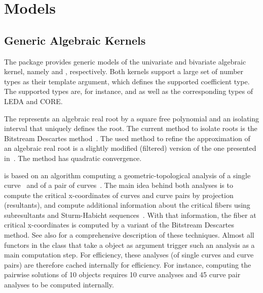 
\section{Models}

\subsection{Generic Algebraic Kernels}

The package provides generic models of the univariate and bivariate algebraic 
kernel, namely  and ,
respectively. Both kernels support a large set of number types as their 
template argument, which defines the supported coefficient type. The supported 
types are, for instance,  and   as well as the corresponding types
of LEDA and CORE. 

The  represents an algebraic real root by a square 
free polynomial and an isolating interval that uniquely defines the root. 
The current method to isolate roots is the Bitstream Descartes
method~\cite{eigenwillig-phd-08}. 
The used method to refine the approximation of an algebraic real root is a 
slightly modified (filtered) version of the one presented in~\cite{abbott-qir-06}. 
The method has quadratic convergence.

 is based on an algorithm computing a 
geometric-topological analysis of a single curve~\cite{ekw-fast-07} and of a
pair of curves~\cite{ek-exact-08}.
The main idea behind both analyses is to compute the critical
x-coordinates of curves and curve pairs by projection (resultants), and compute
additional information about the critical fibers using subresultants
and Sturm-Habicht sequences~\cite{grlr-sturm-habicht-98}. 
With that information, the fiber at    
critical x-coordinates is computed by a variant of the Bitstream
Descartes method.
See also \cite{kerber-phd-09} for a comprehensive description of
these techniques. 
Almost all functors in the class that take a 
object as argument trigger such an analysis as a main computation
step. For efficiency, these analyses (of single curves and curve
pairs) are therefore cached internally for efficiency. For instance,
computing the pairwise solutions of 10  objects
requires 10 curve analyses and 45 curve pair analyses to be computed
internally. 

